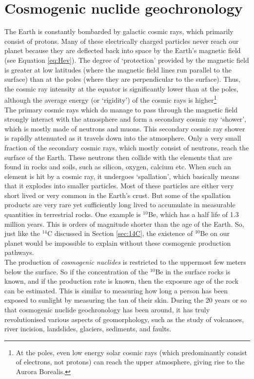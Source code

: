 \chapter[Cosmogenic Nuclides]{Cosmogenic nuclide geochronology}
\label{sec:cosmo}

The Earth is constantly bombarded by galactic cosmic rays, which
primarily consist of protons. Many of these electrically charged
particles never reach our planet because they are deflected back into
space by the Earth's magnetic field (see Equation \ref{eq:Hev}). The
degree of `protection' provided by the magnetic field is greater at
low latitudes (where the magnetic field lines run parallel to the
surface) than at the poles (where they are perpendicular to the
surface). Thus, the cosmic ray intensity at the equator is
significantly lower than at the poles, although the average energy (or
`rigidity') of the cosmic rays is higher\footnote{At the poles, even
  low energy solar cosmic rays (which predominantly consist of
  electrons, not protons) can reach the upper atmosphere, giving rise
  to the Aurora Borealis.}\\

The primary cosmic rays which do manage to pass through the magnetic
field strongly interact with the atmosphere and form a secondary
cosmic ray `shower', which is mostly made of neutrons and muons. This
secondary cosmic ray shower is rapidly attenuated as it travels down
into the atmosphere. Only a very small fraction of the secondary
cosmic rays, which mostly consist of neutrons, reach the surface of
the Earth. These neutrons then collide with the elements that are
found in rocks and soils, such as silicon, oxygen, calcium etc. When
such an element is hit by a cosmic ray, it undergoes `spallation',
which basically means that it explodes into smaller particles. Most of
these particles are either very short lived or very common in the
Earth's crust. But some of the spallation products are very rare yet
sufficiently long lived to accumulate in measurable quantities in
terrestrial rocks. One example is $^{10}$Be, which has a half life of
1.3 million years. This is orders of magnitude shorter than the age of
the Earth. So, just like the $^{14}$C discussed in Section
\ref{sec:14C}, the existence of $^{10}$Be on our planet would be
impossible to explain without these cosmogenic production pathways. \\

The production of \emph{cosmogenic nuclides} is restricted to the
uppermost few meters below the surface. So if the concentration of the
$^{10}$Be in the surface rocks is known, and if the production rate is
known, then the exposure age of the rock can be estimated. This is
similar to measuring how long a person has been exposed to sunlight by
measuring the tan of their skin. During the 20 years or so that
cosmogenic nuclide geochronology has been around, it has truly
revolutionised various aspects of geomorphology, such as the study of
volcanoes, river incision, landslides, glaciers, sediments, and
faults.\\

